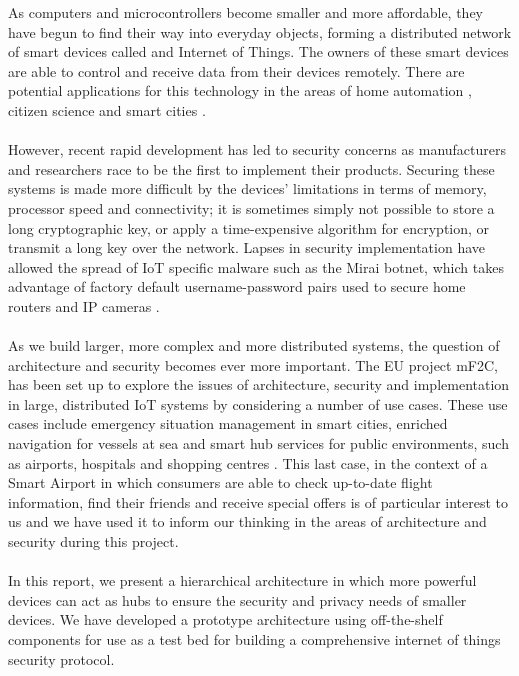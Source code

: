 As computers and microcontrollers become smaller and more affordable, they have begun to find their way into everyday objects, forming a distributed network of smart devices called and Internet of Things. The owners of these smart devices are able to control and receive data from their devices remotely. There are potential applications for this technology in the areas of home automation \cite{openhab}, citizen science \cite{radiation}\cite{flooddetection} and smart cities \cite{smartcities}.

\paragraph{}
However, recent rapid development has led to security concerns as manufacturers and researchers race to be the first to implement their products. Securing these systems is made more difficult by the devices’ limitations in terms of memory, processor speed and connectivity; it is sometimes simply not possible to store a long cryptographic key, or apply a time-expensive algorithm for encryption, or transmit a long key over the network. Lapses in security implementation have allowed the spread of IoT specific malware such as the Mirai botnet, which takes advantage of factory default username-password pairs used to secure home routers and IP cameras \cite{mirai}.

\paragraph{}
As we build larger, more complex and more distributed systems, the question of architecture and security becomes ever more important. The EU project mF2C, has been set up to explore the issues of architecture, security and implementation in large, distributed IoT systems by considering a number of use cases. These use cases include emergency situation management in smart cities, enriched navigation for vessels at sea and smart hub services for public environments, such as airports, hospitals and shopping centres \cite{mf2cwebsite}. This last case, in the context of a Smart Airport in which consumers are able to check up-to-date flight information, find their friends and receive special offers is of particular interest to us and we have used it to inform our thinking in the areas of architecture and security during this project.
 
\paragraph{}
In this report, we present a hierarchical architecture in which more powerful devices can act as hubs to ensure the security and privacy needs of smaller devices.  We have developed a prototype architecture using off-the-shelf components for use as a test bed for building a comprehensive internet of things security protocol.
